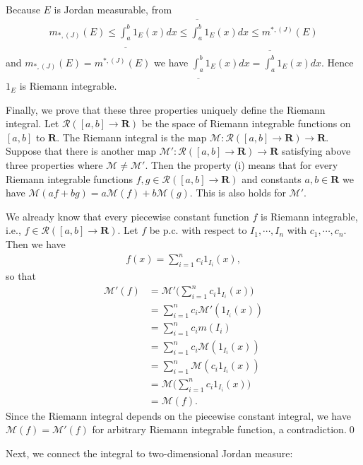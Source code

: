 \documentclass{book}
\theoremstyle{defstyle}
\theoremstyle{thmstyle}
\newcommand{\JIM}{m_{*, (J)}}%
\newcommand{\JOM}{m^{*, (J)}}%
\newcommand{\newa}{\vspace{1em}\indent}
\begin{document}
Because $E$ is Jordan measurable, from
    \begin{align*}
        \JIM(E) \leq \underline{\int_{a}^{b}}1_E(x)dx
        \leq \overline{\int_{a}^{b}}1_E(x)dx
        \leq \JOM(E)
    \end{align*}
and $\JIM(E) = \JOM(E)$ we have $\underline{\int_{a}^{b}}1_E(x)dx = \overline{\int_{a}^{b}}1_E(x)dx$. Hence $1_E$ is Riemann integrable.

Finally, we prove that these three properties uniquely define the Riemann integral. Let $\mathcal{R}([a, b] \to \mathbf{R})$ be the space of Riemann integrable functions on $[a, b]$ to $\mathbf{R}$. The Riemann integral is the map $\mathcal{M} : \mathcal{R}([a, b] \to \mathbf{R}) 
\to \mathbf{R}$. Suppose that there is another map $\mathcal{M}' : \mathcal{R}([a, b] \to \mathbf{R}) \to \mathbf{R}$ satisfying above three properties where $\mathcal{M} \neq \mathcal{M}'$. Then the property (i) means that for every Riemann integrable functions $f, g \in \mathcal{R}([a, b] \to \mathbf{R})$ and constants $a, b \in \mathbf{R}$ we have $\mathcal{M}(af + bg) = a\mathcal{M}(f) + b\mathcal{M}(g)$. This is also holds for $\mathcal{M}'$.

We already know that every piecewise constant function $f$ is Riemann integrable, i.e., $f \in \mathcal{R}([a, b] \to \mathbf{R})$. Let $f$ be p.c. with respect to $I_1, \cdots, I_n$ with $c_1, \cdots, c_n$. Then we have
    \begin{align*}
        f(x) = \sum_{i = 1}^{n}c_i1_{I_i}(x),
    \end{align*}
so that
    \begin{align*}
        \mathcal{M}'(f)
        &= \mathcal{M}'\Big(\sum_{i = 1}^{n}c_i1_{I_i}(x)\Big)\\
        &= \sum_{i = 1}^{n}c_i\mathcal{M}'(1_{I_i}(x))\\
        &= \sum_{i = 1}^{n}c_im(I_i)\\
        &= \sum_{i = 1}^{n}c_i\mathcal{M}(1_{I_i}(x))\\
        &= \sum_{i = 1}^{n}\mathcal{M}(c_i1_{I_i}(x))\\
        &= \mathcal{M}\Big(\sum_{i = 1}^{n}c_i1_{I_i}(x)\Big)\\
        &= \mathcal{M}(f).
    \end{align*}
Since the Riemann integral depends on the piecewise constant integral, we have $\mathcal{M}(f) = \mathcal{M}'(f)$ for arbitrary Riemann integrable function, a contradiction.\qed


\newa Next, we connect the integral to two-dimensional Jordan measure:
\end{document}
